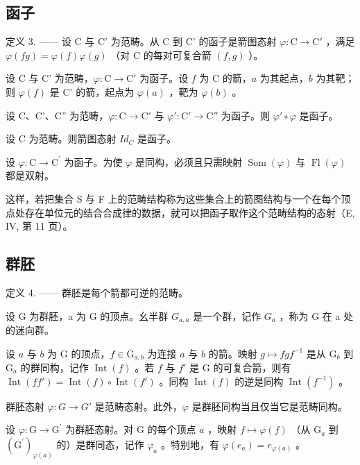 \subsection{函子}

定义 3. —— 设 C 与 C' 为范畴。从 C 到 C' 的函子是箭图态射 \(\varphi\colon\mathrm{C}\to\mathrm{C}'\) ，满足 \(\varphi(fg)=\varphi(f)\varphi(g)\) （对 C 的每对可复合箭 \((f,g)\) ）。

设 C 与 C' 为范畴，\(\varphi\colon\mathrm{C}\to\mathrm{C}'\) 为函子。设 \(f\) 为 C 的箭，\(a\) 为其起点，\(b\) 为其靶；则 \(\varphi(f)\) 是 C' 的箭，起点为 \(\varphi(a)\) ，靶为 \(\varphi(b)\) 。

设 C、C'、C'' 为范畴，\(\varphi\colon\mathrm{C}\to\mathrm{C}'\) 与 \(\varphi'\colon\mathrm{C}'\to\mathrm{C}''\) 为函子。则 \(\varphi'\circ\varphi\) 是函子。

设 C 为范畴。则箭图态射 \(Id_{C}\) 是函子。

设 \(\varphi\colon\mathrm{C}\to\mathrm{C}^{\prime}\) 为函子。为使 \(\varphi\) 是同构，必须且只需映射 \(\operatorname{Som}(\varphi)\) 与 \(\operatorname{Fl}(\varphi)\) 都是双射。

这样，若把集合 S 与 F 上的范畴结构称为这些集合上的箭图结构与一个在每个顶点处存在单位元的结合合成律的数据，就可以把函子取作这个范畴结构的态射（E, IV, 第 11 页）。

\subsection{群胚}

定义 4. —— 群胚是每个箭都可逆的范畴。

设 G 为群胚，a 为 G 的顶点。幺半群 \(G_{a,a}\) 是一个群，记作 \(G_{a}\) ，称为 G 在 a 处的迷向群。

设 \(a\) 与 \(b\) 为 G 的顶点，\(f \in \mathrm{G}_{a,b}\) 为连接 \(a\) 与 \(b\) 的箭。映射 \(g \mapsto fgf^{-1}\) 是从 \(\mathrm{G}_b\) 到 \(\mathrm{G}_a\) 的群同构，记作 \(\operatorname{Int}(f)\) 。若 \(f\) 与 \(f'\) 是 G 的可复合箭，则有 \(\operatorname{Int}(ff') = \operatorname{Int}(f) \circ \operatorname{Int}(f')\) 。同构 \(\operatorname{Int}(f)\) 的逆是同构 \(\operatorname{Int}(f^{-1})\) 。

群胚态射 \(\varphi\colon G\to G'\) 是范畴态射。此外，\(\varphi\) 是群胚同构当且仅当它是范畴同构。

设 \(\varphi\colon\mathrm{G}\to\mathrm{G}^{\prime}\) 为群胚态射。对 G 的每个顶点 \(a\) ，映射 \(f\mapsto\varphi(f)\) （从 \(\mathrm{G}_{a}\) 到 \((\mathrm{G}^{\prime})_{\varphi(a)}\) 的）是群同态，记作 \(\varphi_{a}\) 。特别地，有 \(\varphi(e_{a})=e_{\varphi(a)}\) 。

